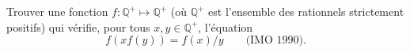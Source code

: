 Trouver une fonction $f : \mathbb{Q}^+ \mapsto \mathbb{Q}^+$ (où $\mathbb{Q}^+$ est l'ensemble des rationnels strictement positifs) qui vérifie, pour tous $x, y \in \mathbb{Q}^+$, l'équation
\[ f(xf(y)) = f(x)/y \qquad \text{(IMO 1990).} \]
